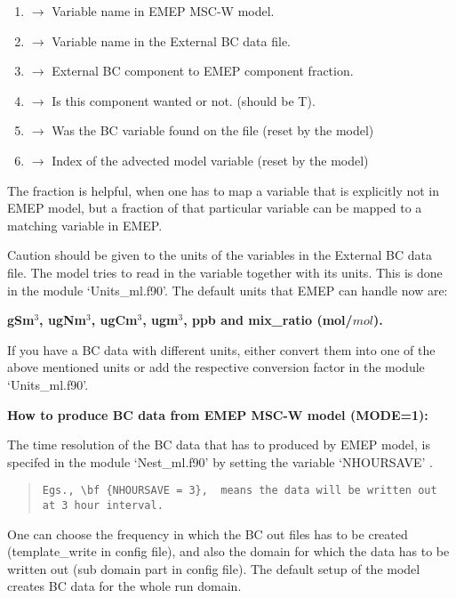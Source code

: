 \begin{enumerate}
\item ${\rightarrow}$  Variable name in EMEP MSC-W model.
\item ${\rightarrow}$  Variable name in the External BC data file. 
\item ${\rightarrow}$  External BC component to EMEP component fraction.  
\item ${\rightarrow}$  Is this component wanted or not.  (should be T). 
\item ${\rightarrow}$  Was the BC variable found on the file (reset by the model)
\item ${\rightarrow}$  Index of the advected model variable (reset by the model)			 
\end{enumerate}

The fraction is helpful, when one has to map a variable that is explicitly not in EMEP 	model, but a fraction of that particular variable can be mapped to a matching variable in EMEP.

Caution should be given to the units of the variables in the External BC data file.  The model tries to read in the variable together with its units.  This is done in the module `Units\_ml.f90'.  The default units that EMEP can handle now are: 

	\bf {gSm$^{3}$, ugNm$^{3}$, ugCm$^{3}$,  ugm$^{3}$, ppb and mix\_ratio (mol/${mol}$)}.

If you have a BC data with different units, either convert them into one of the above 	mentioned units or add the respective conversion factor in the module `Units\_ml.f90'.  

\bf {How to produce BC data from EMEP MSC-W model (MODE=1):}
	
The time resolution of the BC data that has to produced by EMEP model, is specifed in the module `Nest\_ml.f90' by setting the variable `NHOURSAVE' . 
 
\begin{quote}
\begin{verbatim}
Egs., \bf {NHOURSAVE = 3},  means the data will be written out at 3 hour interval. 
\end{verbatim}
\end{quote}

One can choose the frequency in which the BC out files has to be created (template\_write in config file), and also the domain for which the data has to be written out (sub domain part in config file).  The default setup of the model creates BC data for the whole run domain. 
 
